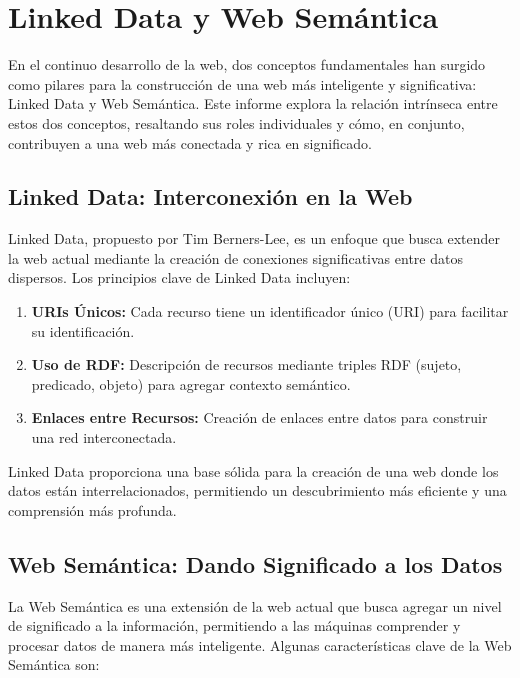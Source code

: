 \documentclass[11pt]{report}
\begin{document}
	\chapter{Linked Data y Web Semántica}
	En el continuo desarrollo de la web, dos conceptos fundamentales han surgido como pilares para la construcción de una web más inteligente y significativa: Linked Data y Web Semántica. Este informe explora la relación intrínseca entre estos dos conceptos, resaltando sus roles individuales y cómo, en conjunto, contribuyen a una web más conectada y rica en significado.
	
	\section*{Linked Data: Interconexión en la Web}
	
	Linked Data, propuesto por Tim Berners-Lee, es un enfoque que busca extender la web actual mediante la creación de conexiones significativas entre datos dispersos. Los principios clave de Linked Data incluyen:
	
	\begin{enumerate}
		\item \textbf{URIs Únicos:} Cada recurso tiene un identificador único (URI) para facilitar su identificación.
	   
		\item \textbf{Uso de RDF:} Descripción de recursos mediante triples RDF (sujeto, predicado, objeto) para agregar contexto semántico.
		
		\item \textbf{Enlaces entre Recursos:} Creación de enlaces entre datos para construir una red interconectada.
	\end{enumerate}
	
	Linked Data proporciona una base sólida para la creación de una web donde los datos están interrelacionados, permitiendo un descubrimiento más eficiente y una comprensión más profunda.
	
	\section*{Web Semántica: Dando Significado a los Datos}
	
	La Web Semántica es una extensión de la web actual que busca agregar un nivel de significado a la información, permitiendo a las máquinas comprender y procesar datos de manera más inteligente. Algunas características clave de la Web Semántica son:
	
\end{document}
